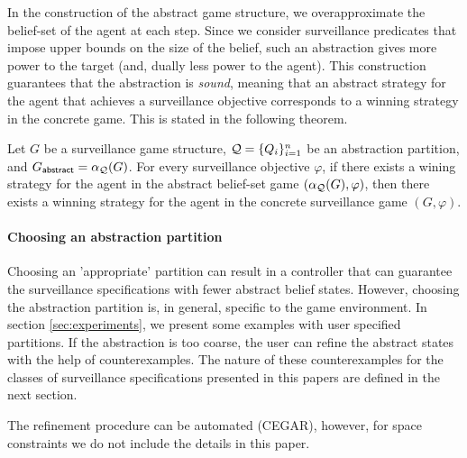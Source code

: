 In the construction of the abstract  game structure, we overapproximate the belief-set of the agent at each step. Since we consider surveillance predicates that impose upper bounds on the size of the belief, such an abstraction  gives more power to the target (and, dually less power to the agent).  This construction guarantees that the abstraction is \emph{sound}, meaning that an abstract strategy for the agent that achieves a surveillance objective corresponds to a winning strategy in the concrete game. This is stated in the following theorem.

\begin{theorem}
Let $G$ be a surveillance game structure, $\mathcal{Q} = \{Q_i\}_{i=1}^n$ be an abstraction partition, and $G_{\mathsf{abstract}} = \alpha_{\mathcal{Q}}(G)$. For every surveillance objective $\varphi$, if there exists a wining strategy for the agent in the abstract belief-set game $(\alpha_{\mathcal{Q}}(G),\varphi)$, then there exists a winning strategy for the agent in the concrete surveillance game $(G,\varphi)$.
\end{theorem}

\paragraph{Choosing an abstraction partition} Choosing an 'appropriate' partition can result in a controller that can guarantee the surveillance specifications with fewer abstract belief states. However, choosing the abstraction partition is, in general, specific to the game environment. In section \ref{sec:experiments}, we present some examples with user specified partitions. If the abstraction is too coarse, the user can refine the abstract states with the help of counterexamples. The nature of these counterexamples for the classes of surveillance specifications presented in this papers are defined in the next section.

The refinement procedure can be automated (CEGAR), however, for space constraints we do not include the details in this paper. 